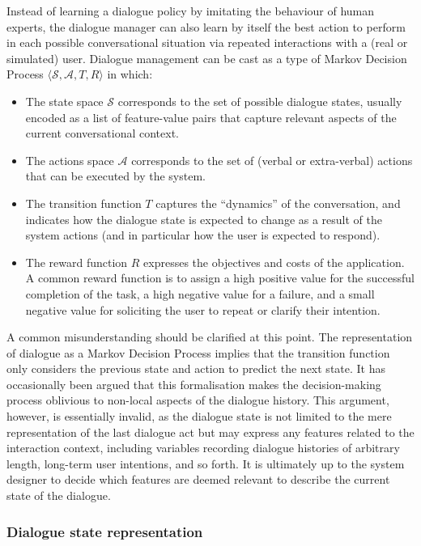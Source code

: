 Instead of learning a dialogue policy by imitating the behaviour of human experts, the dialogue manager can also learn by itself the best action to perform in each possible conversational situation via repeated interactions with a (real or simulated) user.  Dialogue management can be cast as a type of Markov Decision Process $\langle \mathcal{S}, \mathcal{A}, T, R \rangle$ in which: 
\begin{itemize}
\item The state space $\mathcal{S}$ corresponds to the set of possible dialogue states, usually encoded as a list of feature-value pairs that capture relevant aspects of the current conversational context.
\item The actions space $\mathcal{A}$ corresponds to the set of (verbal or extra-verbal) actions that can be executed by the system.
\item The transition function $T$ captures the ``dynamics'' of the conversation, and indicates how the dialogue state is expected to change as a result of the system actions (and in particular how the user is expected to respond). 
\item The reward function $R$ expresses the objectives and costs of the application. A common reward function is to assign a high positive value for the successful completion of the task, a high negative value for a failure, and a small negative value for soliciting the user to repeat or clarify their intention.  
\end{itemize}

A common misunderstanding should be clarified at this point. The representation of dialogue as a Markov Decision Process implies that the transition function only considers the previous state and action to predict the next state.  It has occasionally been argued that this formalisation makes the decision-making process oblivious to non-local aspects of the dialogue history. This argument, however, is essentially invalid, as the dialogue state is not limited to the mere representation of the last dialogue act but may express any features related to the interaction context, including variables recording dialogue histories of arbitrary length, long-term user intentions, and so forth.  It is ultimately up to the system designer to decide which features are deemed relevant to describe the current state of the dialogue.

\subsubsection*{Dialogue state representation}

